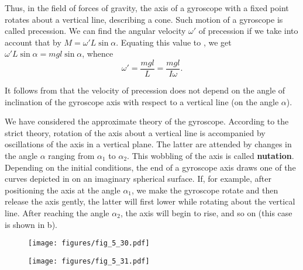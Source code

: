 Thus, in the field of forces of gravity, the axis of a gyroscope with a fixed point rotates about a vertical line, describing a cone. Such motion of a gyroscope is called precession. We can find the angular velocity $\omega'$ of precession if we take into account that by  $M=\omega'L\sin\alpha$. Equating this value to , we get $\omega'L\sin\alpha=mgl\sin\alpha$, whence
\begin{equation}\label{eq:5_72}
	\omega' = \frac{mgl}{L} = \frac{mgl}{I\omega}.
\end{equation}

\noindent
It follows from  that the velocity of precession does not depend on the angle of inclination of the gyroscope axis with respect to a vertical line (on the angle $\alpha$).

We have considered the approximate theory of the gyroscope. According to the strict theory, rotation of the axis about a vertical line is accompanied by oscillations of the axis in a vertical plane. The latter are attended by changes in the angle $\alpha$ ranging from $\alpha_1$ to $\alpha_2$. This wobbling of the axis is called \textbf{nutation}. Depending on the initial conditions, the end of a gyroscope axis draws one of the curves depicted in  on an imaginary spherical surface. If, for example, after positioning the axis at the angle $\alpha_1$, we make the gyroscope rotate and then release the axis gently, the latter will first lower while rotating about the vertical line. After reaching the angle $\alpha_2$, the axis will begin to rise, and so on (this case is shown in b).

\begin{figure}[t]
	\begin{minipage}[t]{0.6\linewidth}
		\begin{center}
			\texttt{[image: figures/fig\_5\_30.pdf]}
			\caption[]{}
			\label{fig:5_30}
		\end{center}
	\end{minipage}
	\hspace{-0.05cm}
	\begin{minipage}[t]{0.36\linewidth}
		\begin{center}
			\texttt{[image: figures/fig\_5\_31.pdf]}
			\caption[]{}
			\label{fig:5_31}
		\end{center}
	\end{minipage}
	\vspace{-0.4cm}
\end{figure}


